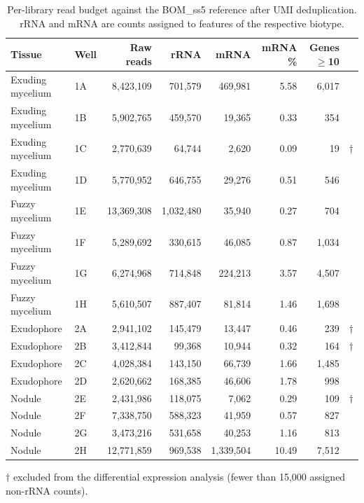 \begin{table}[htbp]
\caption{Per-library read budget against the BOM\_ss5 reference after UMI deduplication. rRNA and mRNA are counts assigned to features of the respective biotype.}\label{tab:budget}
\footnotesize
\begin{tabular}{@{}llrrrrrc@{}}
\toprule
Tissue & Well & Raw reads & rRNA & mRNA & mRNA \% & Genes $\geq$10 &  \\
\midrule
Exuding mycelium & 1A & 8,423,109 & 701,579 & 469,981 & 5.58 & 6,017 &  \\
Exuding mycelium & 1B & 5,902,765 & 459,570 & 19,365 & 0.33 & 354 &  \\
Exuding mycelium & 1C & 2,770,639 & 64,744 & 2,620 & 0.09 & 19 & $\dagger$ \\
Exuding mycelium & 1D & 5,770,952 & 646,755 & 29,276 & 0.51 & 546 &  \\
Fuzzy mycelium & 1E & 13,369,308 & 1,032,480 & 35,940 & 0.27 & 704 &  \\
Fuzzy mycelium & 1F & 5,289,692 & 330,615 & 46,085 & 0.87 & 1,034 &  \\
Fuzzy mycelium & 1G & 6,274,968 & 714,848 & 224,213 & 3.57 & 4,507 &  \\
Fuzzy mycelium & 1H & 5,610,507 & 887,407 & 81,814 & 1.46 & 1,698 &  \\
Exudophore & 2A & 2,941,102 & 145,479 & 13,447 & 0.46 & 239 & $\dagger$ \\
Exudophore & 2B & 3,412,844 & 99,368 & 10,944 & 0.32 & 164 & $\dagger$ \\
Exudophore & 2C & 4,028,384 & 143,150 & 66,739 & 1.66 & 1,485 &  \\
Exudophore & 2D & 2,620,662 & 168,385 & 46,606 & 1.78 & 998 &  \\
Nodule & 2E & 2,431,986 & 118,075 & 7,062 & 0.29 & 109 & $\dagger$ \\
Nodule & 2F & 7,338,750 & 588,323 & 41,959 & 0.57 & 827 &  \\
Nodule & 2G & 3,473,216 & 531,658 & 40,253 & 1.16 & 813 &  \\
Nodule & 2H & 12,771,859 & 969,538 & 1,339,504 & 10.49 & 7,512 &  \\
\bottomrule
\end{tabular}
\begin{tablenotes}[flushleft]\footnotesize\item $\dagger$ excluded from the differential expression analysis (fewer than 15,000 assigned non-rRNA counts).\end{tablenotes}
\end{table}
